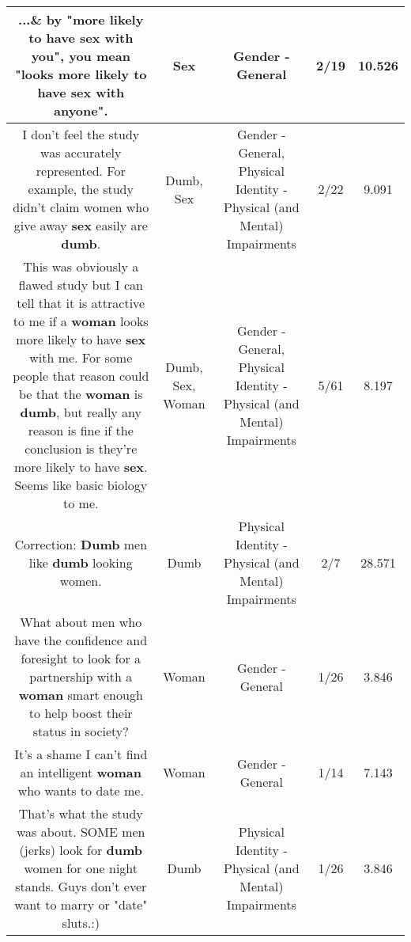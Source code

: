 \documentclass[11pt]{article}
\newlength\mylength
\begin{document}
\begin{center}
\begin{longtable}{|C{.65\mylength}|C{.30\mylength}|C{.12\mylength}|C{.12\mylength}|C{.12\mylength}|}
  \small ...\& by "more likely to have \textbf{sex} with you", you mean "looks more likely to have \textbf{sex} with anyone".\normalsize   & Sex & Gender - General & 2/19 & 10.526 \\  \hline
  \small I don't feel the study was accurately represented. For example, the study didn't claim women who give away \textbf{sex} easily are \textbf{dumb}.\normalsize   & Dumb, Sex & Gender - General, Physical Identity - Physical (and Mental) Impairments & 2/22 & 9.091 \\  \hline
  \small This was obviously a flawed study but I can tell that it is attractive to me if a \textbf{woman} looks more likely to have \textbf{sex} with me. For some people that reason could be that the \textbf{woman} is \textbf{dumb}, but really any reason is fine if the conclusion is they're more likely to have \textbf{sex}. Seems like basic biology to me.\normalsize   & Dumb, Sex, Woman & Gender - General, Physical Identity - Physical (and Mental) Impairments & 5/61 & 8.197 \\  \hline
  \small Correction: \textbf{Dumb} men like \textbf{dumb} looking women.\normalsize   & Dumb & Physical Identity - Physical (and Mental) Impairments & 2/7 & 28.571 \\  \hline
  \small What about men who have the confidence and foresight to look for a partnership with a \textbf{woman} smart enough to help boost their status in society?\normalsize   & Woman & Gender - General & 1/26 & 3.846 \\  \hline
  \small It's a shame I can't find an intelligent \textbf{woman} who wants to date me.\normalsize   & Woman & Gender - General & 1/14 & 7.143 \\  \hline
  \small That's what the study was about.  SOME men (jerks) look for \textbf{dumb} women for one night stands.  Guys don't ever want to marry or "date" sluts.:)\normalsize   & Dumb & Physical Identity - Physical (and Mental) Impairments & 1/26 & 3.846 \\  \hline

\end{longtable}
\end{center}
\end{document}
